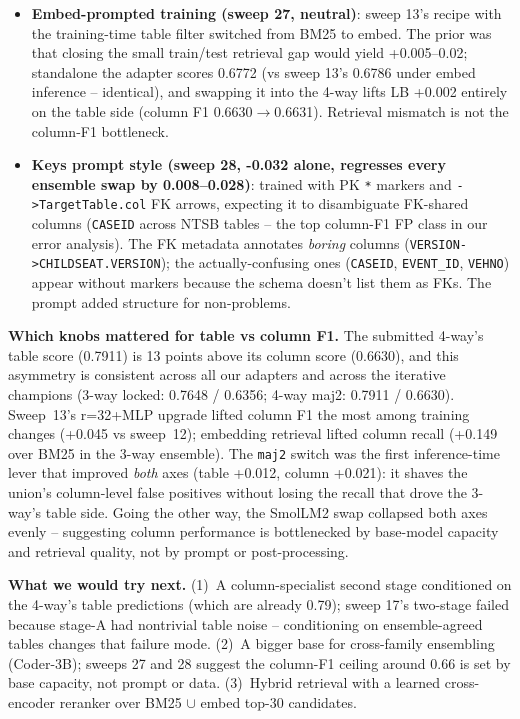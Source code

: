 \documentclass[10pt]{article}
\begin{document}
\begin{itemize}
landed at $\sim$0.61 and regressed the ensemble by 0.007. Likely a mix
of: gradient budget spent on reasoning tokens, descriptive rather than
disambiguating rationales, and early commitment that propagates errors
into the JSON.
\item \textbf{Embed-prompted training (sweep 27, neutral)}: sweep 13's
recipe with the training-time table filter switched from BM25 to embed.
The prior was that closing the small train/test retrieval gap would
yield +0.005--0.02; standalone the adapter scores 0.6772 (vs sweep 13's
0.6786 under embed inference -- identical), and swapping it into the
4-way lifts LB +0.002 entirely on the table side (column F1
0.6630$\rightarrow$0.6631). Retrieval mismatch is not the column-F1
bottleneck.
\item \textbf{Keys prompt style (sweep 28, -0.032 alone, regresses every
ensemble swap by 0.008--0.028)}: trained with PK \texttt{*} markers and
\texttt{->TargetTable.col} FK arrows, expecting it to disambiguate
FK-shared columns (\texttt{CASEID} across NTSB tables -- the top
column-F1 FP class in our error analysis). The FK metadata annotates
\emph{boring} columns (\texttt{VERSION->CHILDSEAT.VERSION}); the
actually-confusing ones (\texttt{CASEID}, \texttt{EVENT\_ID},
\texttt{VEHNO}) appear without markers because the schema doesn't list
them as FKs. The prompt added structure for non-problems.
\end{itemize}

\textbf{Which knobs mattered for table vs column F1.}
The submitted 4-way's table score (0.7911) is 13 points above its column
score (0.6630), and this asymmetry is consistent across all our adapters
and across the iterative champions (3-way locked: 0.7648 / 0.6356; 4-way
maj2: 0.7911 / 0.6630). Sweep~13's r=32+MLP upgrade lifted column F1 the
most among training changes (+0.045 vs sweep~12); embedding retrieval
lifted column recall (+0.149 over BM25 in the 3-way ensemble). The
\texttt{maj2} switch was the first inference-time lever that improved
\emph{both} axes (table +0.012, column +0.021): it shaves the union's
column-level false positives without losing the recall that drove the
3-way's table side. Going the other way, the SmolLM2 swap collapsed both
axes evenly -- suggesting column performance is bottlenecked by base-model
capacity and retrieval quality, not by prompt or post-processing.

\textbf{What we would try next.}
(1)~A column-specialist second stage conditioned on the 4-way's table
predictions (which are already 0.79); sweep 17's two-stage failed
because stage-A had nontrivial table noise -- conditioning on
ensemble-agreed tables changes that failure mode. (2)~A bigger base for
cross-family ensembling (Coder-3B); sweeps 27 and 28 suggest the
column-F1 ceiling around 0.66 is set by base capacity, not prompt or
data. (3)~Hybrid retrieval with a learned cross-encoder reranker over
BM25 $\cup$ embed top-30 candidates.
\end{document}
